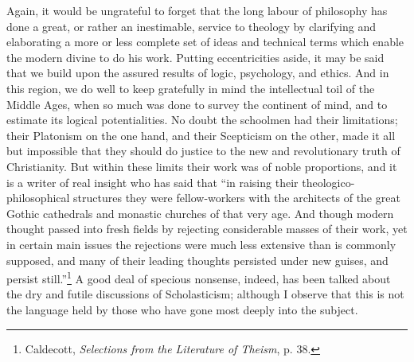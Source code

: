 \documentclass[12pt,a5paper]{article}
\begin{document}
Again, it would be ungrateful to forget that the long
labour of philosophy has done a great, or rather an inestimable,
service to theology by clarifying and elaborating
a more or less complete set of ideas and technical terms
which enable the modern divine to do his work. Putting
eccentricities aside, it may be said that we build upon the
assured results of logic, psychology, and ethics. And in this
region, we do well to keep gratefully in mind the intellectual
toil of the Middle Ages, when so much was done to survey
the continent of mind, and to estimate its logical potentialities.
No doubt the schoolmen had their limitations;
their Platonism on the one hand, and their Scepticism on
the other, made it all but impossible that they should do
justice to the new and revolutionary truth of Christianity.
But within these limits their work was of noble proportions,
and it is a writer of real insight who has said that ``in
raising their theologico-philosophical structures they were
fellow-workers with the architects of the great Gothic
cathedrals and monastic churches of that very age. And
though modern thought passed into fresh fields by rejecting
considerable masses of their work, yet in certain main
issues the rejections were much less extensive than is
commonly supposed, and many of their leading thoughts
persisted under new guises, and persist still.''\footnote{
Caldecott, \textit{Selections from the Literature of Theism}, p. 38.
} 
A good
deal of specious nonsense, indeed, has been talked about
the dry and futile discussions of Scholasticism; although I
observe that this is not the language held by those who
have gone most deeply into the subject.
\end{document}
